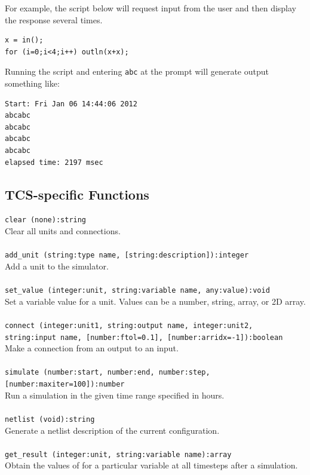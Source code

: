\documentclass{article}
\begin{document}
For example, the script below will request input from the user and then display the response several times.

\begin{verbatim}
x = in();
for (i=0;i<4;i++) outln(x+x);
\end{verbatim}

Running the script and entering \texttt{abc} at the prompt will generate output something like:

\begin{verbatim}
Start: Fri Jan 06 14:44:06 2012
abcabc
abcabc
abcabc
abcabc
elapsed time: 2197 msec
\end{verbatim}

\subsection{TCS-specific Functions}

\texttt{clear (none):string}\\
Clear all units and connections.
\\\\
\texttt{add\_unit (string:type name, [string:description]):integer}\\
Add a unit to the simulator. 
\\\\
\texttt{set\_value (integer:unit, string:variable name, any:value):void}\\
Set a variable value for a unit. Values can be a number, string, array, or 2D array. 
\\\\
\texttt{connect (integer:unit1, string:output name, integer:unit2, string:input name,
[number:ftol=0.1], [number:arridx=-1]):boolean}\\
Make a connection from an output to an input. 
\\\\
\texttt{simulate (number:start, number:end, number:step, [number:maxiter=100]):number}\\
Run a simulation in the given time range specified in hours. 
\\\\
\texttt{netlist (void):string}\\
Generate a netlist description of the current configuration. 
\\\\
\texttt{get\_result (integer:unit, string:variable name):array}\\
Obtain the values of for a particular variable at all timesteps after a simulation. 
\end{document}
